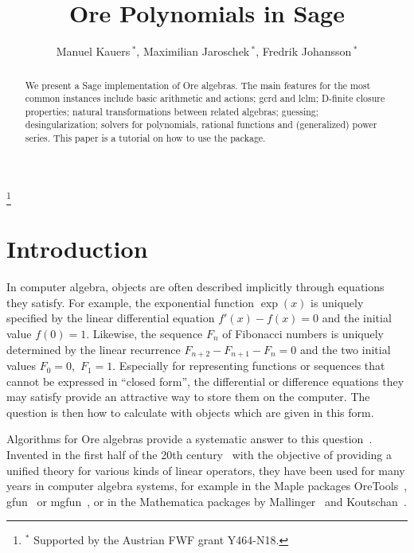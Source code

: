\documentclass[11pt]{amsart}
\begin{document}
 \author[Manuel Kauers, Maximilian Jaroschek, Fredrik Johansson]
   {Manuel Kauers\,$^\ast$, Maximilian Jaroschek\,$^\ast$, Fredrik Johansson\,$^\ast$}
 \address{Manuel Kauers, Research Institute for Symbolic Computation (RISC), J. Kepler University Linz, Austria}
 \address{Maximilian Jaroschek, Research Institute for Symbolic Computation (RISC), J. Kepler University Linz, Austria}
 \address{Fredrik Johansson, Research Institute for Symbolic Computation (RISC), J. Kepler University Linz, Austria}
 \thanks{$^\ast$ Supported by the Austrian FWF grant Y464-N18.}

 \title{Ore Polynomials in Sage}

 \begin{abstract}
We present a Sage implementation of Ore algebras. The main features for the most
common instances include basic arithmetic and actions; gcrd and lclm; D-finite
closure properties; natural transformations between related algebras; guessing;
desingularization; solvers for polynomials, rational functions and (generalized)
power series. This paper is a tutorial on how to use the package.
 \end{abstract}

 \maketitle


\section{Introduction}

In computer algebra, objects are often described implicitly through equations
they satisfy. For example, the exponential function $\exp(x)$ is uniquely
specified by the linear differential equation $f'(x)-f(x)=0$ and the initial
value $f(0)=1$.  Likewise, the sequence $F_n$ of Fibonacci numbers is uniquely
determined by the linear recurrence $F_{n+2}-F_{n+1}-F_n=0$ and the two initial
values $F_0=0$,~$F_1=1$.  Especially for representing functions or sequences
that cannot be expressed in ``closed form'', the differential or difference
equations they may satisfy provide an attractive way to store them on the
computer. The question is then how to calculate with objects which are given in
this form.

Algorithms for Ore algebras provide a systematic answer to this
question~\cite{bronstein96,chyzak98}.  Invented in the first half of the 20th
century~\cite{ore33} with the objective of providing a unified theory for
various kinds of linear operators, they have been used for many years in
computer algebra systems, for example in the Maple packages
OreTools~\cite{abramov03}, gfun~\cite{salvy94} or mgfun~\cite{chyzak98a}, or in
the Mathematica packages by Mallinger~\cite{mallinger96} and
Koutschan~\cite{koutschan10c,koutschan09}.
\end{document}
